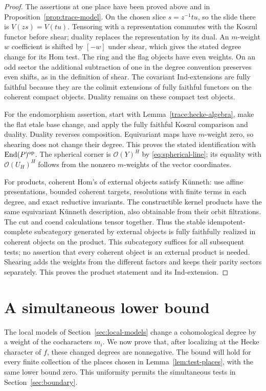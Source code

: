 \documentclass[11pt]{article}
\numberwithin{equation}{section}
\theoremstyle{definition}
\theoremstyle{remark}
\newcommand{\cO}{\mathcal O}
\newcommand{\End}{\operatorname{End}}
\begin{document}
\begin{proof}
The assertions at one place have been proved above and in
Proposition~\ref{prop:trace-model}.  On the chosen slice
$s=z^{-1}tu$, so the slide there is $V(zs)=V(tu)$.  Tensoring with a
representation commutes with the Koszul functor before shear;
duality replaces the representation by its dual.  An $m$-weight $w$
coefficient is shifted by $[-w]$ under shear, which gives the stated
degree change for its Hom test.  The ring and the flag objects have
even weights.  On an odd sector the additional subtraction of one
in the degree convention preserves even shifts, as in the definition
of shear.  The covariant Ind-extensions are fully faithful because they
are the colimit extensions of fully faithful functors on the coherent
compact objects.  Duality remains on these compact test objects.

For the endomorphism assertion, start with
Lemma~\ref{trace:hecke-algebra}, make the flat etale base change, and
apply the fully faithful Koszul comparison and duality.  Duality
reverses composition.  Equivariant maps have $m$-weight zero, so
shearing does not change their degree.  This proves the stated
identification with $\End(P)^{\rm op}$.  The spherical corner is
$\cO(Y)^H$ by \eqref{eq:spherical-line}; its equality with
$\cO(U_H)^H$ follows from the nonzero $m$-weights of the vector
coordinates.

For products, coherent Hom's of external objects satisfy K\"unneth:
use affine presentations, bounded coherent targets, resolutions with
finite terms in each degree, and exact reductive invariants.  The
constructible kernel products have the same equivariant K\"unneth
description, also obtainable from their orbit filtrations.  The cut
and coend calculations tensor together.  Thus the stable
idempotent-complete subcategory generated by external objects is
fully faithfully realized in coherent objects on the product.
This subcategory suffices for all subsequent tests; no assertion
that every coherent object is an external product is needed.
Shearing adds the weights from the different factors and keeps their
parity sectors separately.  This proves the product statement and
its Ind-extension.
\end{proof}


\section{A simultaneous lower bound}
\label{sec:lower-bound}

The local models of Section~\ref{sec:local-models} change a cohomological
degree by a weight of the cocharacters $m_i$.  We now prove that, after
localizing at the Hecke character of $f$, these changed degrees are
nonnegative.  The bound will hold for every finite collection of the
places chosen in Lemma~\ref{lem:test-places}, with the same lower bound
zero.  This uniformity permits the simultaneous tests in
Section~\ref{sec:boundary}.
\end{document}

